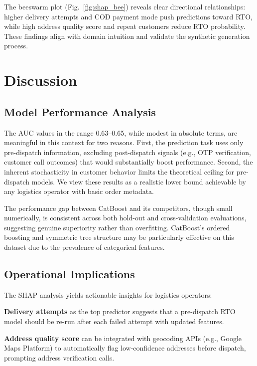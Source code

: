 \documentclass[conference]{IEEEtran}
\begin{document}
The beeswarm plot (Fig.~\ref{fig:shap_bee}) reveals clear directional relationships: higher delivery attempts and COD payment mode push predictions toward RTO, while high address quality score and repeat customers reduce RTO probability. These findings align with domain intuition and validate the synthetic generation process.

\section{Discussion}
\label{sec:discussion}

\subsection{Model Performance Analysis}

The AUC values in the range 0.63--0.65, while modest in absolute terms, are meaningful in this context for two reasons. First, the prediction task uses only pre-dispatch information, excluding post-dispatch signals (e.g., OTP verification, customer call outcomes) that would substantially boost performance. Second, the inherent stochasticity in customer behavior limits the theoretical ceiling for pre-dispatch models. We view these results as a realistic lower bound achievable by any logistics operator with basic order metadata.

The performance gap between CatBoost and its competitors, though small numerically, is consistent across both hold-out and cross-validation evaluations, suggesting genuine superiority rather than overfitting. CatBoost's ordered boosting and symmetric tree structure may be particularly effective on this dataset due to the prevalence of categorical features.

\subsection{Operational Implications}

The SHAP analysis yields actionable insights for logistics operators:

\textbf{Delivery attempts} as the top predictor suggests that a pre-dispatch RTO model should be re-run after each failed attempt with updated features.

\textbf{Address quality score} can be integrated with geocoding APIs (e.g., Google Maps Platform) to automatically flag low-confidence addresses before dispatch, prompting address verification calls.
\end{document}
